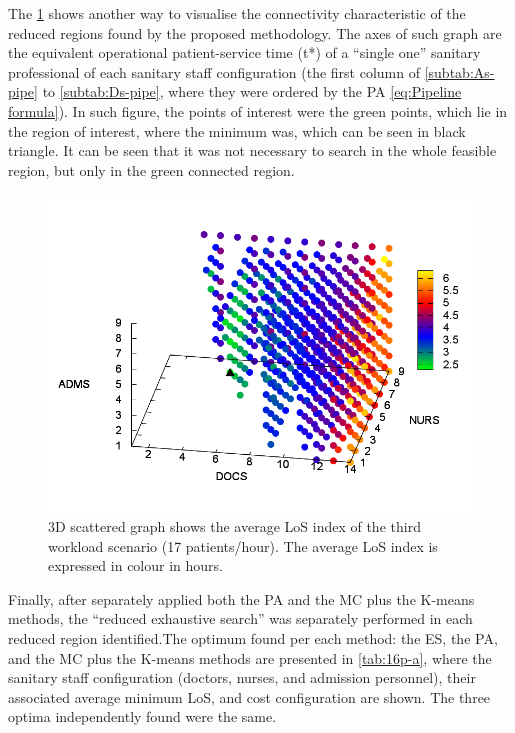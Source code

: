 \documentclass[11pt]{article} %
\begin{document}
The \ref{fig:3D-scattered-graph-100} shows another way to visualise
the connectivity characteristic of the reduced regions found by the
proposed methodology. The axes of such graph are the equivalent operational
patient-service time \foreignlanguage{american}{(t{*})} of a ``single
one'' sanitary professional of each sanitary staff configuration
(the first column of \ref{subtab:As-pipe} to \ref{subtab:Ds-pipe},
where they were ordered by the PA \ref{eq:Pipeline formula}). In
such figure, the points of interest were the green points, which lie
in the region of interest, where the minimum was, which can be seen
in black triangle. It can be seen that it was not necessary to search
in the whole feasible region, but only in the green connected region.
\begin{figure}[h]
\noindent \centering{}\includegraphics[width=0.88\columnwidth,height=0.2\paperheight]{figs4/v0/6400-602-100-3D-scatter-LoS2}\caption{3D scattered graph shows the average LoS index of the third workload
scenario (17 patients/hour). The average LoS index is expressed in
colour in hours. \label{fig:3D-scattered-graph-100}}
\end{figure}


Finally, after separately applied both the PA and the MC plus the
K-means methods, the \textquotedblleft{}reduced exhaustive search\textquotedblright{}
was separately performed in each reduced region identified.The optimum
found per each method: the ES, the PA, and the MC plus the K-means
methods are presented in \ref{tab:16p-a}, where the sanitary staff
configuration (doctors, nurses, and admission personnel), their associated
average minimum LoS, and cost configuration are shown. The three optima
independently found were the same. 
\end{document}
